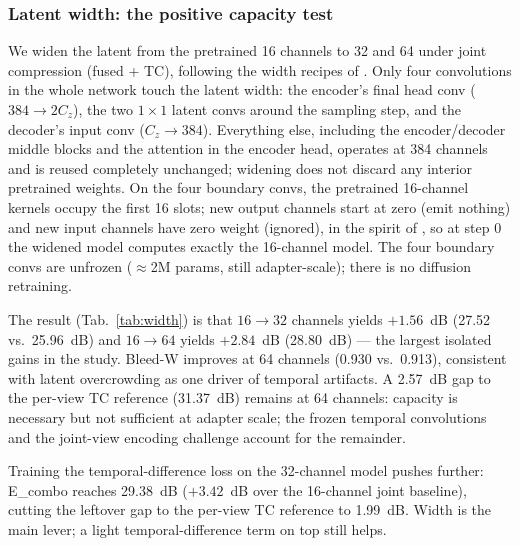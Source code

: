 \subsubsection{Latent width: the positive capacity test}

We widen the latent from the pretrained 16 channels to 32 and 64 under joint compression (fused + TC), following the width recipes of \cite{dai2023emu, chen2024deep, hacohen2024ltx}. Only four convolutions in the whole network touch the latent width: the encoder's final head conv ($384 \to 2C_z$), the two $1{\times}1$ latent convs around the sampling step, and the decoder's input conv ($C_z \to 384$). Everything else, including the encoder/decoder middle blocks and the attention in the encoder head, operates at 384 channels and is reused completely unchanged; widening does not discard any interior pretrained weights. On the four boundary convs, the pretrained 16-channel kernels occupy the first 16 slots; new output channels start at zero (emit nothing) and new input channels have zero weight (ignored), in the spirit of \cite{zhang2023adding}, so at step 0 the widened model computes exactly the 16-channel model. The four boundary convs are unfrozen ($\approx$2M params, still adapter-scale); there is no diffusion retraining.

The result (Tab.~\ref{tab:width}) is that $16{\to}32$ channels yields ${+}1.56$~dB (27.52 vs.\ 25.96~dB) and $16{\to}64$ yields ${+}2.84$~dB (28.80~dB) --- the largest isolated gains in the study. Bleed-W improves at 64 channels (0.930 vs.\ 0.913), consistent with latent overcrowding as one driver of temporal artifacts. A 2.57~dB gap to the per-view TC reference (31.37~dB) remains at 64 channels: capacity is necessary but not sufficient at adapter scale; the frozen temporal convolutions and the joint-view encoding challenge account for the remainder.

Training the temporal-difference loss on the 32-channel model pushes further: E\_combo reaches 29.38~dB (${+}3.42$~dB over the 16-channel joint baseline), cutting the leftover gap to the per-view TC reference to 1.99~dB. Width is the main lever; a light temporal-difference term on top still helps.


